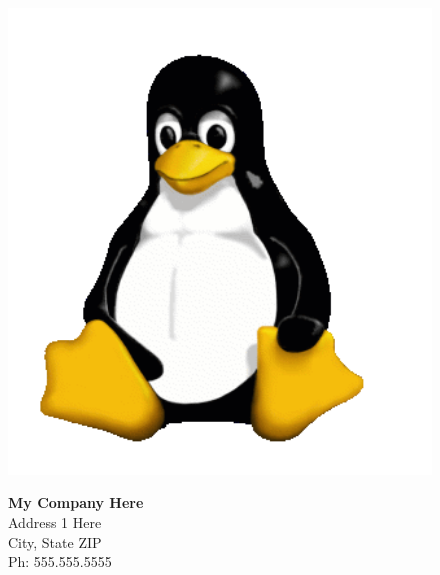\begin{titlepage}
	\vspace{250pt}
	\begin{figure}[ht]
		\begin{minipage}[ht][.7in][c]{0.3\linewidth}
			\centering
			\includegraphics[width=1\textwidth]{logo}
		\end{minipage}
		\hspace{0.5cm}
		\begin{minipage}[ht][.7in][c]{0.6\linewidth}
			\begin{flushright}
				\large
				{\bfseries My Company Here} \\ 
				Address 1 Here \\ 
				City, State ZIP  \\ 
				Ph: 555.555.5555
			\end{flushright}
		\end{minipage}
	\end{figure}

	\end{titlepage}
